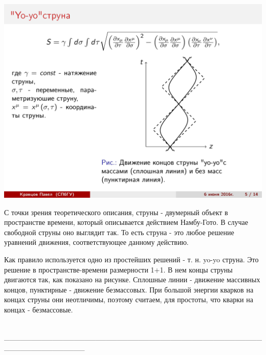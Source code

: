 \documentclass[14pt]{article}
\renewcommand{\line}{\\ \_\_\_\_\_\_\_\_\_\_\_\_\_\_\_\_\_\_\_\_\_\_\_\_\_\_\_\_\_\_\_\_\_\_\_\_\_\_\_\_\_\_\_\_\_\_\_\_\_\_\_\_\_\_\_\_\_\_\_\_\_\_\_ \\ }
\begin{document}
\begin{minipage}[h]{0.5\linewidth}
\includegraphics[width=1\linewidth]{page-05.jpg}
\end{minipage}
\begin{minipage}[h]{0.45\linewidth}
С точки зрения теоретического описания, струны - двумерный объект в пространстве времени, который описывается действием Намбу-Гото. В случае свободной струны оно выглядит так. То есть струна - это любое решение уравнений движения, соответствующее данному действию.

Как правило используется одно из простейших решений - т. н. yo-yo струна. Это решение в пространстве-времени размерности 1+1. В нем концы струны двигаются так, как показано на рисунке. Сплошные линии - движение массивных концов, пунктирные - движение безмассовых. При большой энергии кварков на концах струны они неотличимы, поэтому считаем, для простоты, что кварки на концах - безмассовые.
\end{minipage}
\line
\end{document}
